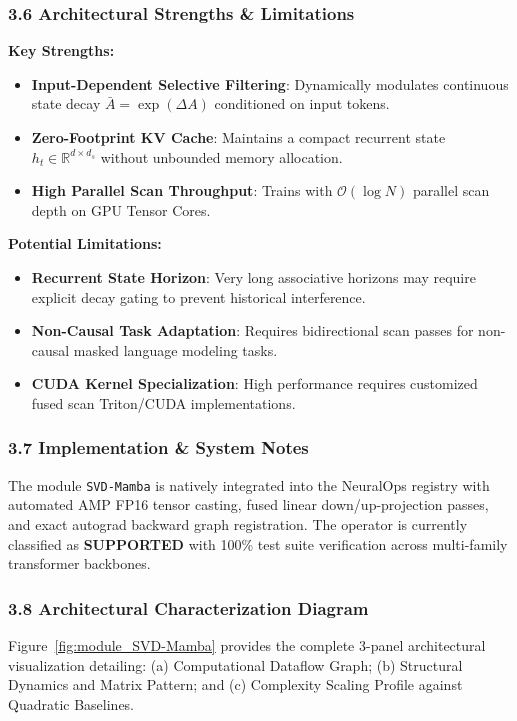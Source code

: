\subsubsection*{3.6 Architectural Strengths \& Limitations}
\textbf{Key Strengths:}
\begin{itemize}
    \item \textbf{Input-Dependent Selective Filtering}: Dynamically modulates continuous state decay $\bar{A} = \exp(\Delta A)$ conditioned on input tokens.
    \item \textbf{Zero-Footprint KV Cache}: Maintains a compact recurrent state $h_t \in \mathbb{R}^{d \times d_s}$ without unbounded memory allocation.
    \item \textbf{High Parallel Scan Throughput}: Trains with $\mathcal{O}(\log N)$ parallel scan depth on GPU Tensor Cores.
\end{itemize}

\textbf{Potential Limitations:}
\begin{itemize}
    \item \textbf{Recurrent State Horizon}: Very long associative horizons may require explicit decay gating to prevent historical interference.
    \item \textbf{Non-Causal Task Adaptation}: Requires bidirectional scan passes for non-causal masked language modeling tasks.
    \item \textbf{CUDA Kernel Specialization}: High performance requires customized fused scan Triton/CUDA implementations.
\end{itemize}

\subsubsection*{3.7 Implementation \& System Notes}
The module \texttt{SVD-Mamba} is natively integrated into the NeuralOps registry with automated AMP FP16 tensor casting, fused linear down/up-projection passes, and exact autograd backward graph registration. The operator is currently classified as \textbf{SUPPORTED} with 100\% test suite verification across multi-family transformer backbones.

\subsubsection*{3.8 Architectural Characterization Diagram}
Figure~\ref{fig:module_SVD-Mamba} provides the complete 3-panel architectural visualization detailing: (a) Computational Dataflow Graph; (b) Structural Dynamics and Matrix Pattern; and (c) Complexity Scaling Profile against Quadratic Baselines.


